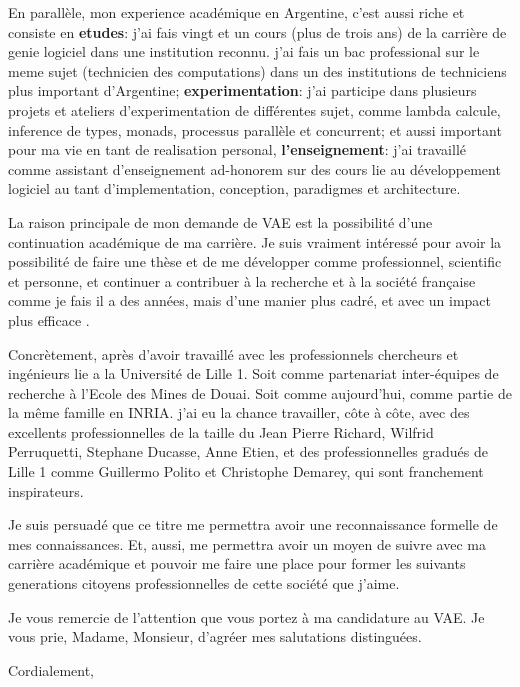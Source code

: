 \documentclass[11pt]{letter} %
\begin{document}
\begin{letter}{}
En parallèle, mon experience académique en Argentine, c'est aussi riche et consiste en \textbf{etudes}: j'ai fais vingt et un cours (plus de trois ans) de la carrière de genie logiciel dans une institution reconnu. j'ai fais un bac professional sur le meme sujet (technicien des computations) dans un des institutions de techniciens plus important d'Argentine;   \textbf{experimentation}: j'ai participe dans plusieurs projets et ateliers d'experimentation de différentes sujet, comme lambda calcule, inference de types, monads, processus parallèle et concurrent;  et aussi important pour ma vie en tant de realisation personal, \textbf{l'enseignement}: j'ai travaillé comme assistant d'enseignement ad-honorem sur des cours lie au développement logiciel au tant d'implementation, conception, paradigmes et architecture.


La raison principale de mon demande de VAE est la possibilité d'une continuation académique de ma carrière. Je suis vraiment intéressé pour avoir la possibilité de faire une thèse et de me développer comme professionnel, scientific et personne, et continuer a contribuer à la recherche et à la société française comme je fais il a des années, mais  d'une manier plus cadré, et avec un impact plus efficace . 



Concrètement, après d'avoir travaillé avec les professionnels chercheurs et ingénieurs lie a la Université de Lille 1. Soit comme partenariat inter-équipes de recherche à l'Ecole des Mines de Douai. Soit comme aujourd'hui, comme partie de la même famille en INRIA. j'ai eu la chance travailler, côte à côte, avec des excellents professionnelles de la taille du Jean Pierre Richard, Wilfrid Perruquetti, Stephane Ducasse, Anne Etien, et des professionnelles gradués de Lille 1 comme Guillermo Polito et Christophe Demarey, qui sont franchement inspirateurs. 


Je suis persuadé que ce titre me permettra avoir une reconnaissance formelle de mes connaissances. Et, aussi, me permettra avoir un moyen de suivre avec ma carrière académique et pouvoir me faire une place pour former les suivants generations citoyens professionnelles de cette société que j'aime.

Je vous remercie de l'attention que vous portez à ma candidature au VAE. Je vous prie, Madame, Monsieur, d'agréer mes salutations distinguées.


\closing{Cordialement,}




\end{letter}
\end{document}
